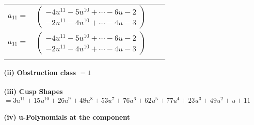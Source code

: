 \documentclass[1p]{elsarticle_modified}
\theoremstyle{definition}
\begin{document}
\begin{tabular}{m{7pt} m{180pt} m{7pt} m{180pt} }
\flushright $a_{11}=$&$\begin{pmatrix}-4 u^{11}-5 u^{10}+\cdots-6 u-2\\-2 u^{11}-4 u^{10}+\cdots-4 u-3\end{pmatrix}$\\ \flushright $a_{11}=$&$\begin{pmatrix}-4 u^{11}-5 u^{10}+\cdots-6 u-2\\-2 u^{11}-4 u^{10}+\cdots-4 u-3\end{pmatrix}$\\&\end{tabular}
\flushleft \textbf{(ii) Obstruction class $= 1$}\\~\\
\flushleft \textbf{(iii) Cusp Shapes $= 3 u^{11}+15 u^{10}+26 u^9+48 u^8+53 u^7+76 u^6+62 u^5+77 u^4+23 u^3+49 u^2+u+11$}\\~\\
\newpage\renewcommand{\arraystretch}{1}
\flushleft \textbf{(iv) u-Polynomials at the component}\newline \\
\end{document}
